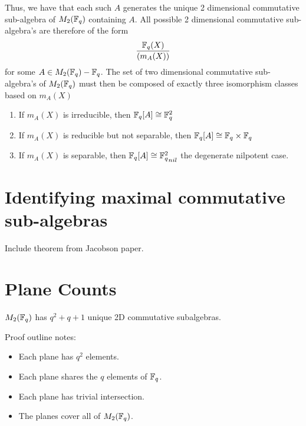 \documentclass{amsart}
\begin{document}
    Thus, we have that each such $A$ generates the unique 2 dimensional commutative sub-algebra of $M_2(\protect\mathbb{F}_q)$ containing $A$. All possible 2 dimensional commutative sub-algebra's are therefore of the form
    \begin{align*}
        \frac{\protect\mathbb{F}_q(X)}{(m_A(X))}
    \end{align*}
    for some $A \in M_2(\protect\mathbb{F}_q) - \protect\mathbb{F}_q$. The set of two dimensional commutative sub-algebra's of $M_2(\protect\mathbb{F}_q)$ must then be composed of exactly three isomorphism classes based on $m_A(X)$
    \begin{enumerate}
        \item If $m_A(X)$ is irreducible, then $\protect\mathbb{F}_q[A] \cong \protect\mathbb{F}_q^2$
        \item If $m_A(X)$ is reducible but not separable, then $\protect\mathbb{F}_q[A] \cong \protect\mathbb{F}_q \times \protect\mathbb{F}_q$
        \item If $m_A(X)$ is separable, then $\bF_q[A] \cong {\bF_q^2}_{nil}$ the degenerate nilpotent case.
    \end{enumerate}

    

\section{Identifying maximal commutative sub-algebras}
Include theorem from Jacobson paper.

\section{Plane Counts}

\begin{theorem}\label{totalcount}
    $M_2(\protect\mathbb{F}_q)$ has $q^2 + q + 1$ unique 2D commutative subalgebras.
\end{theorem}

Proof outline notes:
\begin{itemize}
    \item Each plane has $q^2$ elements.
    \item Each plane shares the $q$ elements of $\protect\mathbb{F}_q$.
    \item Each plane has trivial intersection.
    \item The planes cover all of $M_2(\protect\mathbb{F}_q)$.
\end{itemize}
\end{document}
